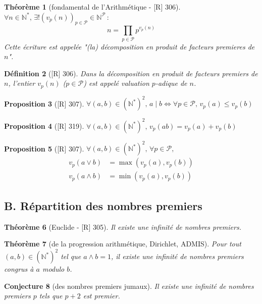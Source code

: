 \documentclass[10pt, a4paper, parskip=full, twoside, twocolumn]{report}
\newtheorem{definition}{Définition}
\newtheorem{theorem}[definition]{Théorème}
\newtheorem{proposition}[definition]{Proposition}
\newtheorem{conjecture}[definition]{Conjecture}
\newcommand{\IN}{\mathbb{N}}
\begin{document}
\begin{theorem}[fondamental de l'Arithmétique - \textnormal{[R] 306}]
	$\forall n\in\IN^*,\,\exists ! \left(v_p(n)\right)_{p\in\mathcal{P}}\in\IN^{\mathcal{P}} \,\colon$ 
	$$n = \prod_{p\in\mathcal{P}} p^{v_p(n)}$$
	Cette écriture est appelée \emph{"(la) décomposition en produit de facteurs premieres de $n$"}.
\end{theorem}

\begin{definition}[\textnormal{[R] 306}]
	Dans la décomposition en produit de facteurs premiers de $n$, l'entier $v_p(n)$ ($p\in\mathcal{P}$) est appelé \emph{valuation $p$-adique de $n$}.
\end{definition}

\begin{proposition}[\textnormal{[R] 307}]
	$\forall(a,b)\in\left(\IN^*\right)^2,\, a\mid b\iff \forall p\in\mathcal{P},\, v_p(a)\leq v_p(b)$
\end{proposition}

\begin{proposition}[\textnormal{[R] 319}]
	$\forall(a,b)\in\left(\IN^*\right)^2,\, v_p(ab) = v_p(a)+v_p(b)$
\end{proposition}

\begin{proposition}[\textnormal{[R] 307}]
	$\forall(a,b)\in\left(\IN^*\right)^2,\,\forall p\in\mathcal{P},$
	\begin{align*}
		v_p(a\vee b) &= \max (v_p(a),v_p(b)) \\
		v_p(a\wedge b) &= \min (v_p(a),v_p(b))
	\end{align*}
\end{proposition}

\subsection*{B. Répartition des nombres premiers}
\begin{theorem}[Euclide - \textnormal{[R] 305}]
	Il existe une infinité de nombres premiers.
\end{theorem}

\begin{theorem}[de la progression arithmétique, Dirichlet, ADMIS]
	Pour tout $(a,b)\in\left(\IN^*\right)^2$ tel que $a\wedge b = 1$, il existe une infinité de nombres premiers congrus à $a$ modulo $b$.
\end{theorem}

\begin{conjecture}[des nombres premiers jumaux]
	Il existe une infinité de nombres premiers $p$ tels que $p+2$ est premier.
\end{conjecture}
\end{document}
